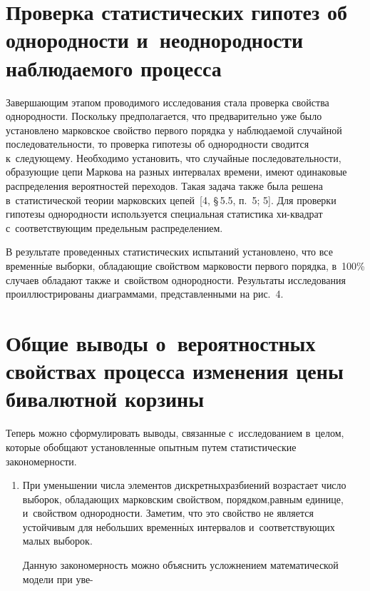 \begin{multicols}{2}
 


\section{Проверка статистических гипотез об однородности 
и~неоднородности наблюдаемого процесса}

\vspace*{-2pt}
  
  Завершающим этапом проводимого исследования стала проверка свойства 
однородности. Поскольку предполагается, что предварительно уже было 
установлено марковское свойство первого порядка у наблюдаемой случайной 
по\-сле\-до\-ва\-тель\-ности, то проверка гипотезы об однородности сводится 
к~сле\-ду\-юще\-му. Необходимо установить, что 
  случайные последовательности, 
об\-ра\-зу\-ющие цепи Маркова на разных интервалах времени, имеют одинаковые 
распределения вероятностей переходов. Такая задача также была решена 
в~статистической теории марковских цепей~[4, \S\,5.5, п.~5; 5]. Для 
проверки гипотезы однородности используется специальная статистика  
хи-квад\-рат с~соответствующим предельным распределением.
  
  В результате проведенных статистических испытаний установлено, что все 
временн$\acute{\mbox{ы}}$е выборки, обладающие свойством марковости первого порядка, 
в~100\% случаев обладают также и~свойством однородности. Результаты 
исследования проиллюстрированы диаграммами, представленными на рис.~4.

\vspace*{-8pt}

\section{Общие выводы о~вероятностных свойствах процесса 
изменения цены бивалютной корзины}

\vspace*{-3pt}
  
  Теперь можно сформулировать выводы, связанные с~исследованием в~целом, 
которые обобщают установленные опытным путем статистические 
закономерности. 
  \begin{enumerate}[1.]
\item При уменьшении числа элементов дискретных\linebreak разбиений возрастает 
число выборок, обла\-да\-ющих марковским свойством, порядком,\linebreak равным 
единице, и~свойством од\-но\-род\-ности. Заметим, что это свойство не является 
устойчивым для небольших временн$\acute{\mbox{ы}}$х интервалов 
и~со\-от\-вет\-ст\-ву\-ющих малых выборок.

Данную закономерность можно объяснить усложнением математической 
модели при уве-\linebreak\vspace*{-12pt}
\end{enumerate}

\pagebreak

\end{multicols}

